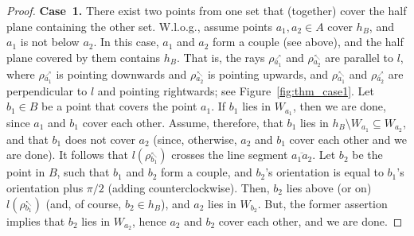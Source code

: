 \documentclass[11pt,letter]{article}
\newcommand{\old}[1]{{{}}}
\def\segment#1#2{{\overline{#1#2}}}
\def\wedge#1{{W_{{#1}}}}
\def\halfplane#1{{h_{{#1}}}}
\def\leftray#1{{\rho{\stackrel{_\nwarrow}{_{#1}}}}}
\def\rightray#1{{\rho{\stackrel{_\nearrow}{_{#1}}}}}
\def\leftline#1{{l(\leftray{#1})}}
\begin{document}
\begin{proof}
\old{
\begin{figure}[htp]
   \centering
       \texttt{[image: fig/thm\_figure4]}
   \caption{Proof of Theorem~\ref{thm:twosets} --- Case 1.}
   \label{fig:thm_case1}
\end{figure}
}
{\bf Case~1.}
There exist two points from one set that (together) cover the half plane containing the other set.
W.l.o.g., assume points $a_1, a_2 \in A$ cover $\halfplane{B}$, and $a_1$ is not below $a_2$.
In this case, $a_1$ and $a_2$ form a couple (see above), and the half plane covered by them
contains $\halfplane{B}$. That is, the rays $\rightray{a_1}$ and $\leftray{a_2}$ are parallel to $l$, where
$\rightray{a_1}$ is pointing downwards and $\leftray{a_2}$ is pointing upwards, and $\leftray{a_1}$ and $\rightray{a_2}$
are perpendicular to $l$ and pointing rightwards; see Figure~\ref{fig:thm_case1}.
Let $b_1 \in B$ be a point that covers the point $a_1$.
If $b_1$ lies in $\wedge{a_1}$, then we are done, since $a_1$ and $b_1$ cover each other.
Assume, therefore, that $b_1$ lies in $\halfplane{B} \setminus \wedge{a_1} \subseteq \wedge{a_2}$, and that $b_1$ does not
cover $a_2$ (since, otherwise, $a_2$ and $b_1$ cover each other and we are done).
It follows that $\leftline{b_1}$ crosses the line segment $\segment{a_1}{a_2}$.
Let $b_2$ be the point in $B$, such that $b_1$ and $b_2$ form a couple, and $b_2$'s orientation is equal to $b_1$'s orientation plus $\pi/2$ (adding counterclockwise). Then, $b_2$ lies above (or on) $\leftline{b_1}$ (and, of course, $b_2 \in \halfplane{B}$), and $a_2$ lies in $\wedge{b_2}$. But,
the former assertion implies that $b_2$ lies in $\wedge{a_2}$, hence $a_2$ and $b_2$ cover each other, and we are done.



\old{
\begin{figure}[htp]
   \centering
       \texttt{[image: fig/thm\_figure6]}
   \caption{Proof of Theorem~\ref{thm:twosets} --- Case 2.}
   \label{fig:thm_case2}
\end{figure}
}


\end{proof}
\end{document}
